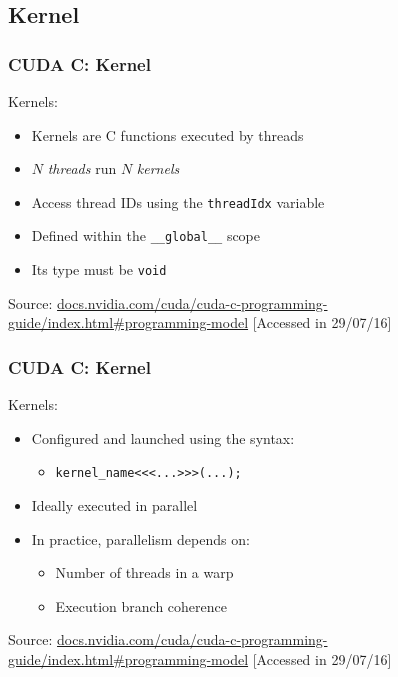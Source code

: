 \documentclass[10pt, compress]{beamer}
\begin{document}
\subsection{Kernel}

\begin{frame}
    \frametitle{CUDA C: Kernel}
    \alert{Kernels}:
    \begin{itemize}
        \item \alert{Kernels} are C functions executed by \alert{threads}
        \item $N$ \textit{threads} run $N$ \textit{kernels}

        \item Access thread \alert{ID}s using the \alert{\texttt{threadIdx}} variable

        \item Defined within the \alert{\texttt{\_\_global\_\_}} scope
        \item Its type must be \alert{\texttt{void}}
    \end{itemize}

    \vfill

    \begin{center}
        \tiny{Source: \url{docs.nvidia.com/cuda/cuda-c-programming-guide/index.html\#programming-model} [Accessed in 29/07/16]}
    \end{center}
\end{frame}

\begin{frame}
    \frametitle{CUDA C: Kernel}
    \alert{Kernels}:
    \begin{itemize}
        \item Configured and launched using the syntax:
            \begin{itemize}
                \item \texttt{kernel\_name\alert{<<<}...\alert{>>>}(...);}
            \end{itemize}

        \item Ideally executed in \alert{parallel}

        \item In practice, parallelism depends on:
            \begin{itemize}
                \item Number of threads in a warp

                \item Execution branch coherence
            \end{itemize}
    \end{itemize}

    \vfill

    \begin{center}
        \tiny{Source: \url{docs.nvidia.com/cuda/cuda-c-programming-guide/index.html\#programming-model} [Accessed in 29/07/16]}
    \end{center}
\end{frame}
\end{document}
